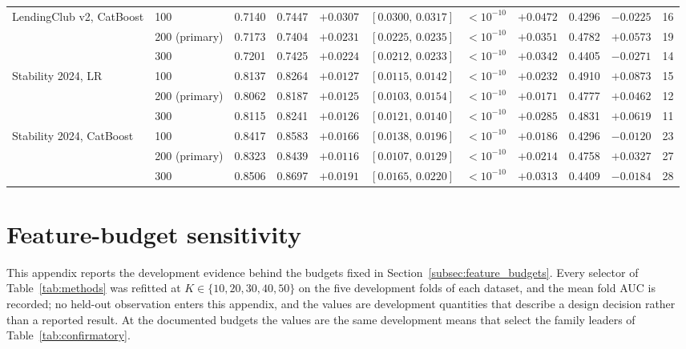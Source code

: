\documentclass[final,5p,twocolumn]{elsarticle}
\newcommand{\Kfeat}{K}
\begin{document}
\begin{table}[htbp]
\begin{threeparttable}
\begin{tabular}{@{}llrrrlrrrrr@{}}
\addlinespace
LendingClub v2, CatBoost & 100 & 0.7140 & 0.7447 & $+0.0307$ & $[0.0300,\,0.0317]$ & $<10^{-10}$ & $+0.0472$ & 0.4296 & $-0.0225$ & 16 \\
 & 200 (primary) & 0.7173 & 0.7404 & $+0.0231$ & $[0.0225,\,0.0235]$ & $<10^{-10}$ & $+0.0351$ & 0.4782 & $+0.0573$ & 19 \\
 & 300 & 0.7201 & 0.7425 & $+0.0224$ & $[0.0212,\,0.0233]$ & $<10^{-10}$ & $+0.0342$ & 0.4405 & $-0.0271$ & 14 \\
\addlinespace
Stability 2024, LR & 100 & 0.8137 & 0.8264 & $+0.0127$ & $[0.0115,\,0.0142]$ & $<10^{-10}$ & $+0.0232$ & 0.4910 & $+0.0873$ & 15 \\
 & 200 (primary) & 0.8062 & 0.8187 & $+0.0125$ & $[0.0103,\,0.0154]$ & $<10^{-10}$ & $+0.0171$ & 0.4777 & $+0.0462$ & 12 \\
 & 300 & 0.8115 & 0.8241 & $+0.0126$ & $[0.0121,\,0.0140]$ & $<10^{-10}$ & $+0.0285$ & 0.4831 & $+0.0619$ & 11 \\
\addlinespace
Stability 2024, CatBoost & 100 & 0.8417 & 0.8583 & $+0.0166$ & $[0.0138,\,0.0196]$ & $<10^{-10}$ & $+0.0186$ & 0.4296 & $-0.0120$ & 23 \\
 & 200 (primary) & 0.8323 & 0.8439 & $+0.0116$ & $[0.0107,\,0.0129]$ & $<10^{-10}$ & $+0.0214$ & 0.4758 & $+0.0327$ & 27 \\
 & 300 & 0.8506 & 0.8697 & $+0.0191$ & $[0.0165,\,0.0220]$ & $<10^{-10}$ & $+0.0313$ & 0.4409 & $-0.0184$ & 28 \\
\bottomrule
\end{tabular}
\end{threeparttable}
\end{table}

\section{Feature-budget sensitivity}
\label{app:budgets}
\setcounter{table}{0}\setcounter{figure}{0}

This appendix reports the development evidence behind the budgets fixed in Section~\ref{subsec:feature_budgets}. Every selector of Table~\ref{tab:methods} was refitted at $\Kfeat \in \{10,20,30,40,50\}$ on the five development folds of each dataset, and the mean fold AUC is recorded; no held-out observation enters this appendix, and the values are development quantities that describe a design decision rather than a reported result. At the documented budgets the values are the same development means that select the family leaders of Table~\ref{tab:confirmatory}.
\end{document}
